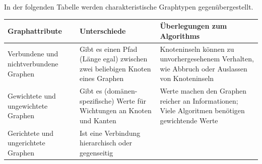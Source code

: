 \documentclass[12pt,ngerman,]{article}
\begin{document}
In der folgenden Tabelle werden charakteristische Graphtypen
gegenübergestellt.

\begin{longtable}[]{@{}lll@{}}
\toprule
\begin{minipage}[b]{0.14\columnwidth}\raggedright\strut
Graphattribute\strut
\end{minipage} & \begin{minipage}[b]{0.18\columnwidth}\raggedright\strut
Unterschiede\strut
\end{minipage} & \begin{minipage}[b]{0.59\columnwidth}\raggedright\strut
Überlegungen zum Algorithms\strut
\end{minipage}\tabularnewline
\midrule
\endhead
\begin{minipage}[t]{0.14\columnwidth}\raggedright\strut
Verbundene und nichtverbundene Graphen\strut
\end{minipage} & \begin{minipage}[t]{0.18\columnwidth}\raggedright\strut
Gibt es einen Pfad (Länge egal) zwischen zwei beliebigen Knoten eines
Graphen\strut
\end{minipage} & \begin{minipage}[t]{0.59\columnwidth}\raggedright\strut
Knoteninseln können zu unvorhergesehenem Verhalten, wie Abbruch oder
Auslassen von Knoteninseln\strut
\end{minipage}\tabularnewline
\begin{minipage}[t]{0.14\columnwidth}\raggedright\strut
Gewichtete und ungewichtete Graphen\strut
\end{minipage} & \begin{minipage}[t]{0.18\columnwidth}\raggedright\strut
Gibt es (domänen-spezifische) Werte für Wichtungen an Knoten und
Kanten\strut
\end{minipage} & \begin{minipage}[t]{0.59\columnwidth}\raggedright\strut
Werte machen den Graphen reicher an Informationen; Viele Algoritmen
benötigen gewichtende Werte\strut
\end{minipage}\tabularnewline
\begin{minipage}[t]{0.14\columnwidth}\raggedright\strut
Gerichtete und ungerichtete Graphen\strut
\end{minipage} & \begin{minipage}[t]{0.18\columnwidth}\raggedright\strut
Ist eine Verbindung hierarchisch oder gegenseitig\strut
\end{minipage} & \begin{minipage}[t]{0.59\columnwidth}\raggedright\strut

\end{minipage}
\end{longtable}
\end{document}
